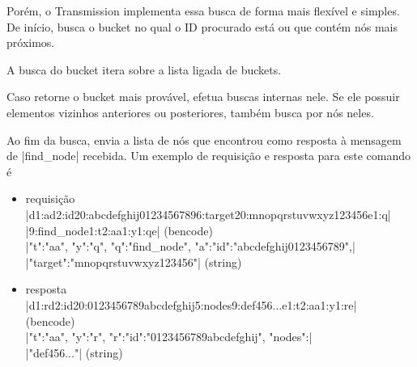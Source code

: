Porém, o Transmission implementa essa busca de forma mais flexível e simples. De início,
busca o \gls*{bucket} no qual o ID procurado está ou que contém nós mais próximos.


A busca do \gls*{bucket} itera sobre a lista ligada de \glspl*{bucket}.


Caso retorne o \gls*{bucket} mais provável, efetua buscas internas nele. Se ele possuir
elementos vizinhos anteriores ou posteriores, também busca por nós neles.


Ao fim da busca, envia a lista de nós que encontrou como resposta à mensagem de
\bverb|find_node| recebida. Um exemplo de requisição e resposta para este comando é

\begin{itemize}
    \item requisição \\
        \bverb|d1:ad2:id20:abcdefghij01234567896:target20:mnopqrstuvwxyz123456e1:q| \\
        \bverb|9:find_node1:t2:aa1:y1:qe| (\gls*{bencode}) \\
        \sverb|{"t":"aa", "y":"q", "q":"find_node", "a":{"id":"abcdefghij0123456789",| \\
        \sverb|"target":"mnopqrstuvwxyz123456"}}| (\gls*{string})

    \item resposta \\
        \bverb|d1:rd2:id20:0123456789abcdefghij5:nodes9:def456...e1:t2:aa1:y1:re| \\
        (\gls*{bencode}) \\
        \sverb|{"t":"aa", "y":"r", "r":{"id":"0123456789abcdefghij", "nodes":| \\
        \sverb|"def456..."}}| (\gls*{string})
\end{itemize}